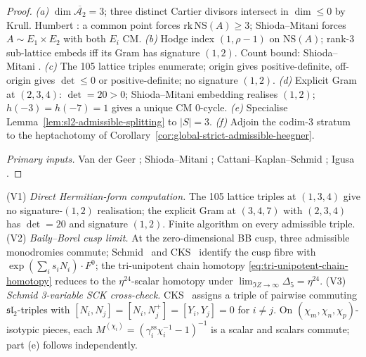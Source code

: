 \begin{proof}
\emph{(a)} $\dim\overline{\mathcal A_2}=3$; three distinct Cartier
divisors intersect in $\dim\leq 0$ by Krull. Humbert
\cite[\S 9.1]{VanDerGeer1988}: a common point forces
$\mathrm{rk}\,\mathrm{NS}(A)\geq 3$; Shioda--Mitani
\cite[\S 1]{ShiodaMitani1974} forces $A\sim E_1\times E_2$ with both
$E_i$ CM.
\emph{(b)} Hodge index $(1,\rho-1)$ on $\mathrm{NS}(A)$; rank-$3$
sub-lattice embeds iff its Gram has signature $(1,2)$. Count bound:
Shioda--Mitani \cite[\S 1, Cor.~2]{ShiodaMitani1974}.
\emph{(c)} The 105 lattice triples enumerate; origin gives
positive-definite, off-origin gives $\det\leq 0$ or positive-definite;
no signature $(1,2)$.
\emph{(d)} Explicit Gram at $(2,3,4)$: $\det=20>0$; Shioda--Mitani
embedding realises $(1,2)$; $h(-3)=h(-7)=1$ gives a unique CM
0-cycle.
\emph{(e)} Specialise
Lemma~\textup{\ref{lem:sl2-admissible-splitting}} to $|S|=3$.
\emph{(f)} Adjoin the codim-$3$ stratum to the heptachotomy of
Corollary~\textup{\ref{cor:global-strict-admissible-heegner}}.

\emph{Primary inputs.} Van der Geer
\cite[Ch.~IX, \S 1]{VanDerGeer1988}; Shioda--Mitani
\cite[\S 1]{ShiodaMitani1974}; Cattani--Kaplan--Schmid
\cite[Thm.~3.3, \S 3.7]{CattaniKaplanSchmid1986}; Igusa
\cite[\S 4]{Igusa72}.
\end{proof}

\begin{remark}
\label{rem:three-verification-paths-codim3-heegner}
%
\textup{(V1)} \emph{Direct Hermitian-form computation.} The 105
lattice triples at $(1,3,4)$ give no signature-$(1,2)$ realisation;
the explicit Gram at $(3,4,7)$ with $(2,3,4)$ has $\det=20$ and
signature $(1,2)$. Finite algorithm on every admissible triple.
\textup{(V2)} \emph{Baily--Borel cusp limit.} At the zero-dimensional
BB cusp, three admissible monodromies commute;
Schmid~\cite[\S 5]{Schmid1973} and
CKS~\cite[\S 4]{CattaniKaplanSchmid1986} identify the cusp fibre with
$\exp(\sum_i s_i N_i)\cdot F^0$; the tri-unipotent chain homotopy
\textup{\eqref{eq:tri-unipotent-chain-homotopy}} reduces to the
$\eta^{24}$-scalar homotopy under
$\lim_{\Im Z\to\infty}\Delta_5=\eta^{24}$.
\textup{(V3)} \emph{Schmid 3-variable SCK cross-check.}
CKS~\cite[Thm.~3.3, \S 3.7]{CattaniKaplanSchmid1986} assigns a triple
of pairwise commuting $\mathfrak{sl}_2$-triples with
$[N_i,N_j]=[N_i,N_j^+]=[Y_i,Y_j]=0$ for $i\neq j$. On
$(\chi_m,\chi_n,\chi_p)$-isotypic pieces, each
$M^{(\chi_i)}=(\gamma_i^{\mathrm{ss}}\chi_i^{-1}-1)^{-1}$ is a scalar
and scalars commute; part (e) follows independently.
\end{remark}

